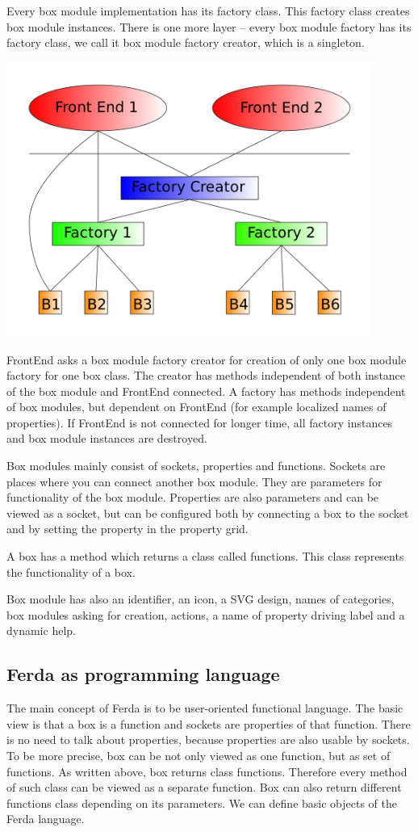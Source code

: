 \documentclass[a4paper,12pt]{book}
\begin{document}
Every box module implementation has its factory class. This factory class creates box module instances. There is one more layer -- every box module factory has its factory class, we call it box module factory creator, which is a singleton.

\noindent\includegraphics[width=12cm]{creatorFactory}

FrontEnd asks a box module factory creator for creation of only one box module factory for one box class. The creator has methods independent of both instance of the box module and FrontEnd connected. A factory has methods independent of box modules, but dependent on FrontEnd (for example localized names of properties). If FrontEnd is not connected for longer time, all factory instances and box module instances are destroyed.

Box modules mainly consist of sockets, properties and functions. Sockets are places where you can connect another box module. They are parameters for functionality of the box module. Properties are also parameters and can be viewed as a socket, but can be configured both by connecting a box to the socket and by setting the property in the property grid.

A box has a method which returns a class called functions. This class represents the functionality of a box.

Box module has also an identifier, an icon, a SVG design, names of categories, box modules asking for creation, actions, a name of property driving label and a dynamic help.

\subsection{Ferda as programming language}
The main concept of Ferda is to be user-oriented functional language. The basic view is that a box is a function and sockets are properties of that function. There is no need to talk about properties, because properties are also usable by sockets. To be more precise, box can be not only viewed as one function, but as set of functions. As written above, box returns class functions. Therefore every method of such class can be viewed as a separate function. Box can also return different functions class depending on its parameters. We can define basic objects of the Ferda language.
\end{document}
